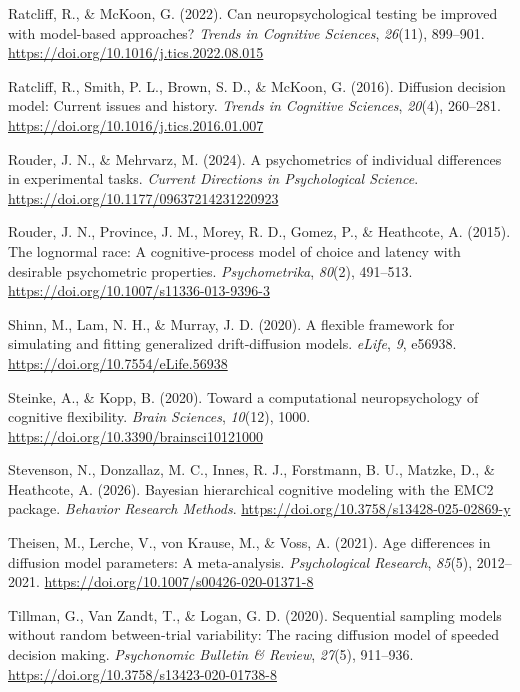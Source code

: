 \documentclass[
  jou,
  floatsintext,
  longtable,
  nolmodern,
  notxfonts,
  notimes,
  12pt,
  colorlinks=true,linkcolor=blue,citecolor=blue,urlcolor=blue]{apa7}
\newlength{\cslhangindent}
\newenvironment{CSLReferences}[2] %
 {\begin{list}{}{%
  \setlength{\itemindent}{0pt}
  \setlength{\leftmargin}{0pt}
  \setlength{\parsep}{0pt}
  \ifodd #1
   \setlength{\leftmargin}{\cslhangindent}
   \setlength{\itemindent}{-1\cslhangindent}
  \fi
  \setlength{\itemsep}{#2\baselineskip}}}
 {\end{list}}
\begin{document}
\begin{CSLReferences}{1}{0}
Ratcliff, R., \& McKoon, G. (2022). Can neuropsychological testing be
improved with model-based approaches? \emph{Trends in Cognitive
Sciences}, \emph{26}(11), 899--901.
\url{https://doi.org/10.1016/j.tics.2022.08.015}

Ratcliff, R., Smith, P. L., Brown, S. D., \& McKoon, G. (2016).
Diffusion decision model: Current issues and history. \emph{Trends in
Cognitive Sciences}, \emph{20}(4), 260--281.
\url{https://doi.org/10.1016/j.tics.2016.01.007}

Rouder, J. N., \& Mehrvarz, M. (2024). A psychometrics of individual
differences in experimental tasks. \emph{Current Directions in
Psychological Science}. \url{https://doi.org/10.1177/09637214231220923}

Rouder, J. N., Province, J. M., Morey, R. D., Gomez, P., \& Heathcote,
A. (2015). The lognormal race: A cognitive-process model of choice and
latency with desirable psychometric properties. \emph{Psychometrika},
\emph{80}(2), 491--513. \url{https://doi.org/10.1007/s11336-013-9396-3}

Shinn, M., Lam, N. H., \& Murray, J. D. (2020). A flexible framework for
simulating and fitting generalized drift-diffusion models. \emph{eLife},
\emph{9}, e56938. \url{https://doi.org/10.7554/eLife.56938}

Steinke, A., \& Kopp, B. (2020). Toward a computational neuropsychology
of cognitive flexibility. \emph{Brain Sciences}, \emph{10}(12), 1000.
\url{https://doi.org/10.3390/brainsci10121000}

Stevenson, N., Donzallaz, M. C., Innes, R. J., Forstmann, B. U., Matzke,
D., \& Heathcote, A. (2026). Bayesian hierarchical cognitive modeling
with the {EMC2} package. \emph{Behavior Research Methods}.
\url{https://doi.org/10.3758/s13428-025-02869-y}

Theisen, M., Lerche, V., von Krause, M., \& Voss, A. (2021). Age
differences in diffusion model parameters: A meta-analysis.
\emph{Psychological Research}, \emph{85}(5), 2012--2021.
\url{https://doi.org/10.1007/s00426-020-01371-8}

Tillman, G., Van Zandt, T., \& Logan, G. D. (2020). Sequential sampling
models without random between-trial variability: The racing diffusion
model of speeded decision making. \emph{Psychonomic Bulletin \& Review},
\emph{27}(5), 911--936. \url{https://doi.org/10.3758/s13423-020-01738-8}


\end{CSLReferences}
\end{document}
